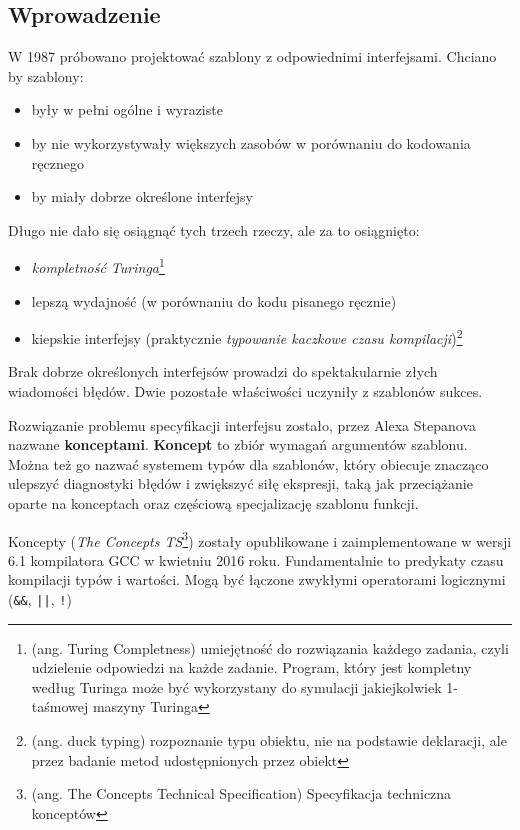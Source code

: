 \documentclass[11pt, a4paper]{article}
\begin{document}
\lstset{language=C++}

\subsection*{Wprowadzenie}
W 1987 próbowano projektować szablony z odpowiednimi interfejsami. Chciano by szablony:

\begin{itemize}

\item były w pełni ogólne i wyraziste
\item by nie wykorzystywały większych zasobów w porównaniu do kodowania ręcznego
\item by miały dobrze określone interfejsy

\end{itemize}

\noindent Długo nie dało się osiągnąć tych trzech rzeczy, ale za to osiągnięto:

\begin{itemize}

\item \emph{kompletność Turinga}\footnote{(ang. Turing Completness) umiejętność do rozwiązania każdego zadania, czyli udzielenie odpowiedzi na każde zadanie. Program, który jest kompletny według Turinga może być wykorzystany do symulacji jakiejkolwiek 1-taśmowej maszyny Turinga}
\item lepszą wydajność (w porównaniu do kodu pisanego ręcznie)
\item kiepskie interfejsy (praktycznie \emph{typowanie kaczkowe czasu kompilacji})\footnote{(ang. duck typing) rozpoznanie typu obiektu, nie na podstawie deklaracji, ale przez badanie metod udostępnionych przez obiekt}

\end{itemize}

Brak dobrze określonych interfejsów prowadzi do spektakularnie złych wiadomości błędów. Dwie pozostałe właściwości uczyniły z szablonów sukces.

Rozwiązanie problemu specyfikacji interfejsu zostało, przez Alexa Stepanova nazwane \textbf{konceptami}. \textbf{Koncept} to zbiór wymagań argumentów szablonu. Można też go nazwać systemem typów dla szablonów, który obiecuje znacząco ulepszyć diagnostyki błędów i zwiększyć siłę ekspresji, taką jak przeciążanie oparte na konceptach oraz częściową specjalizację szablonu funkcji.

Koncepty (\emph{The Concepts TS}\footnote{(ang. The Concepts Technical Specification) Specyfikacja techniczna konceptów}) zostały opublikowane i zaimplementowane w wersji 6.1 kompilatora GCC w kwietniu 2016 roku. Fundamentalnie to predykaty czasu kompilacji typów i wartości. Mogą być łączone zwykłymi operatorami logicznymi (\verb#&&#, \verb#||#, \verb#!#)

\end{document}
